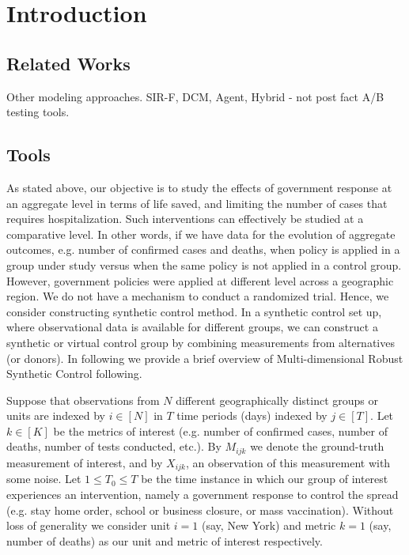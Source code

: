 \documentclass[12pt]{article}
\begin{document}
		\section{Introduction}
		\label{SEC1}
			\subsection{Related Works}
		Other modeling approaches. SIR-F, DCM, Agent, Hybrid - not post fact A/B testing tools.
		
		\subsection{Tools}
		As stated above, our objective is to study the effects of government response at an aggregate level in terms of life saved, and limiting the number of cases that requires hospitalization. Such interventions can effectively be studied at a comparative level. In other words, if we have data for the evolution of aggregate outcomes, e.g. number of confirmed cases and deaths, when policy is applied in a group under study versus when the same policy is not applied in a control group. However, government policies were applied at different level across a geographic region.  We do not have a mechanism to conduct a randomized trial. Hence, we consider constructing synthetic control method\cite{ap08746, JMLR18, AMSS19}. In a synthetic control set up, where observational data is available for different groups, we can construct a synthetic or virtual control group by combining measurements from alternatives (or donors). In following we provide a brief overview of Multi-dimensional Robust Synthetic Control following\cite{AMSS19}.\par
		
		Suppose that observations from $N$ different geographically distinct groups or units are indexed by $i \in [N]$ in $T$ time periods (days) indexed by $j \in [T]$. Let $k \in [K]$ be the metrics of interest (e.g. number of confirmed cases, number of deaths, number of tests conducted, etc.). By $M_{ijk}$ we denote the ground-truth measurement of interest, and by $X_{ijk}$, an observation of this measurement with some noise. Let $1 \leq T_0 \leq T$ be the time instance in which our group of interest experiences an intervention, namely a government response to control the spread (e.g. stay home order, school or business closure, or mass vaccination). Without loss of generality we consider unit $i = 1$ (say, New York) and metric $k = 1$ (say, number of deaths) as our unit and metric of interest respectively.\par
		
\end{document}
